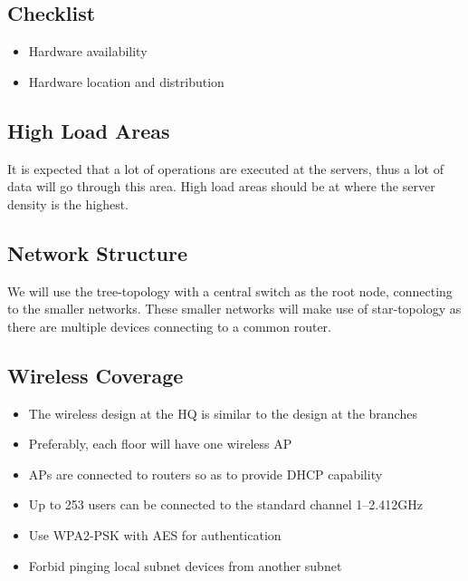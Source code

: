 \subsection{Checklist}
\begin{itemize}
  \item Hardware availability
  \item Hardware location and distribution
\end{itemize}

\subsection{High Load Areas}
It is expected that a lot of operations are executed at the servers, thus a lot of data will go through this area.
High load areas should be at where the server density is the highest.

\subsection{Network Structure}
We will use the tree-topology with a central switch as the root node, connecting to the smaller networks.
These smaller networks will make use of star-topology as there are multiple devices connecting to a common router.

\subsection{Wireless Coverage}
\begin{itemize}
  \item The wireless design at the HQ is similar to the design at the branches
  \item Preferably, each floor will have one wireless AP
  \item APs are connected to routers so as to provide DHCP capability
  \item Up to 253 users can be connected to the standard channel 1--2.412GHz
  \item Use WPA2-PSK with AES for authentication
  \item Forbid pinging local subnet devices from another subnet
\end{itemize}
